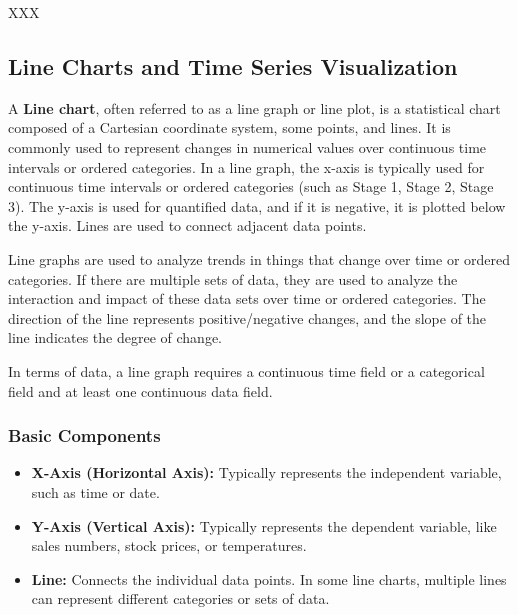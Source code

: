 \documentclass{article}\usepackage[]{graphicx}\usepackage[]{xcolor}
\begin{document}
XXX %


\subsection{Line Charts and Time Series Visualization}

A \textbf{Line chart}, often referred to as a line graph or line plot, is a statistical chart composed of a Cartesian coordinate system, some points, and lines. It is commonly used to represent changes in numerical values over continuous time intervals or ordered categories. In a line graph, the x-axis is typically used for continuous time intervals or ordered categories (such as Stage 1, Stage 2, Stage 3). The y-axis is used for quantified data, and if it is negative, it is plotted below the y-axis. Lines are used to connect adjacent data points.

Line graphs are used to analyze trends in things that change over time or ordered categories. If there are multiple sets of data, they are used to analyze the interaction and impact of these data sets over time or ordered categories. The direction of the line represents positive/negative changes, and the slope of the line indicates the degree of change.

In terms of data, a line graph requires a continuous time field or a categorical field and at least one continuous data field.


\subsubsection{Basic Components}
\begin{itemize}
  \item \textbf{X-Axis (Horizontal Axis):} Typically represents the independent variable, such as time or date.
  \item \textbf{Y-Axis (Vertical Axis):} Typically represents the dependent variable, like sales numbers, stock prices, or temperatures.
  \item \textbf{Line:} Connects the individual data points. In some line charts, multiple lines can represent different categories or sets of data.
\end{itemize}
\end{document}
